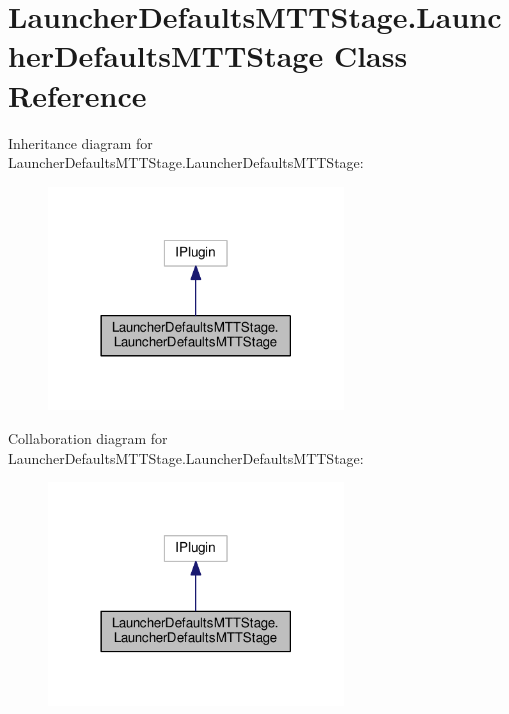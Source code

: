 \hypertarget{class_launcher_defaults_m_t_t_stage_1_1_launcher_defaults_m_t_t_stage}{\section{Launcher\-Defaults\-M\-T\-T\-Stage.\-Launcher\-Defaults\-M\-T\-T\-Stage Class Reference}
\label{class_launcher_defaults_m_t_t_stage_1_1_launcher_defaults_m_t_t_stage}
}


Inheritance diagram for Launcher\-Defaults\-M\-T\-T\-Stage.\-Launcher\-Defaults\-M\-T\-T\-Stage\-:
\nopagebreak
\begin{figure}[H]
\begin{center}
\leavevmode
\includegraphics[width=222pt]{class_launcher_defaults_m_t_t_stage_1_1_launcher_defaults_m_t_t_stage__inherit__graph}
\end{center}
\end{figure}


Collaboration diagram for Launcher\-Defaults\-M\-T\-T\-Stage.\-Launcher\-Defaults\-M\-T\-T\-Stage\-:
\nopagebreak
\begin{figure}[H]
\begin{center}
\leavevmode
\includegraphics[width=222pt]{class_launcher_defaults_m_t_t_stage_1_1_launcher_defaults_m_t_t_stage__coll__graph}
\end{center}
\end{figure}
